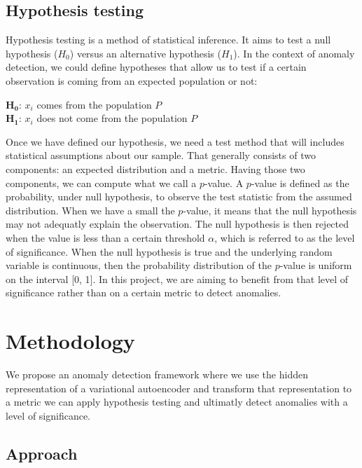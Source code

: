 \documentclass{article}
\begin{document}
\subsection{Hypothesis testing}

Hypothesis testing is a method of statistical inference. It aims to test a null hypothesis ($H_0$) versus an alternative hypothesis ($H_1$). In the context of anomaly detection, we could define hypotheses that allow us to test if a certain observation is coming from an expected population or not:
\newline

\noindent $\boldsymbol{H_0}$: $x_i$ comes from the population $P$ \\
$\boldsymbol{H_1}$: $x_i$ does not come from the population $P$
\newline

\noindent Once we have defined our hypothesis, we need a test method that will includes statistical assumptions about our sample. That generally consists of two components: an expected distribution and a metric. Having those two components, we can compute what we call a $p$-value. A $p$-value is defined as the probability, under null hypothesis, to observe the test statistic from the assumed distribution. When we have a small the $p$-value, it means that the null hypothesis may not adequatly explain the observation. The null hypothesis is then rejected when the value is less than a certain threshold $\alpha$, which is referred to as the level of significance. When the null hypothesis is true and the underlying random variable is continuous, then the probability distribution of the $p$-value is uniform on the interval [0, 1]. In this project, we are aiming to benefit from that level of significance rather than on a certain metric to detect anomalies.


\section{Methodology}

We propose an anomaly detection framework where we use the hidden representation of a variational autoencoder and transform that representation to a metric we can apply hypothesis testing and ultimatly detect anomalies with a level of significance.

\subsection{Approach}
\end{document}
